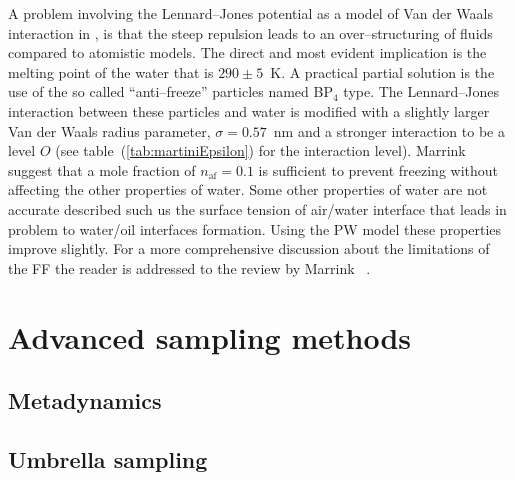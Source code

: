 A problem involving the Lennard--Jones potential as a model of Van der Waals interaction in \martini, is that the steep repulsion leads to an over--structuring of fluids compared to atomistic models. The direct and most evident implication is the melting point of the water that is $290 \pm 5$~K. A practical partial solution is the use of the so called ``anti--freeze'' particles named BP$_4$ type. The Lennard--Jones interaction between these particles and water is modified with a slightly larger Van der Waals radius parameter, $\sigma = 0.57$~nm and a stronger interaction to be a level $O$ (see table~(\ref{tab:martiniEpsilon}) for the interaction level). Marrink \etal\, suggest that a mole fraction of $n_{\text{af}} = 0.1$ is sufficient to prevent freezing without affecting the other properties of water. Some other properties of water are not accurate described such us the surface tension of air/water interface that leads in problem to water/oil interfaces formation. Using the \ac{PW} model these properties improve slightly. For a more comprehensive discussion about the limitations of the \martini \ac{FF} the reader is addressed to the review by Marrink \etal\, \cite{MartiniReview}.

\section{Advanced sampling methods}
	\subsection{Metadynamics}

	\subsection{Umbrella sampling} %


